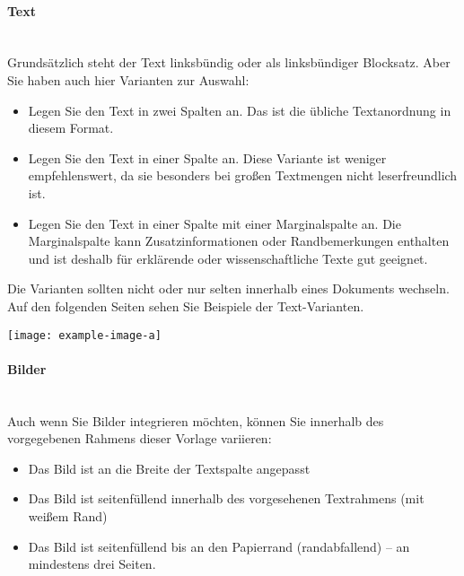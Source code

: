 \documentclass[parskip=on, twoside]{scrartcl}
\begin{document}
\begin{multicols*}{2}
  \paragraph{Text}\strut\\
  Grundsätzlich steht der Text linksbündig oder als linksbündiger Blocksatz.
  Aber Sie haben auch hier Varianten zur Auswahl:
  \begin{itemize}
    \item Legen Sie den Text in zwei Spalten an. Das ist die übliche
      Textanordnung in diesem Format.
    \item Legen Sie den Text in einer Spalte an. Diese Variante ist weniger
      empfehlenswert, da sie besonders bei großen Textmengen nicht
      leserfreundlich ist.
    \item Legen Sie den Text in einer Spalte mit einer Marginalspalte an. Die
      Marginalspalte kann Zusatzinformationen oder Randbemerkungen enthalten
      und ist deshalb für erklärende oder wissenschaftliche Texte gut
      geeignet.
  \end{itemize}
  Die Varianten sollten nicht oder nur selten innerhalb eines Dokuments
  wechseln. Auf den folgenden Seiten sehen Sie Beispiele der Text-Varianten.
\end{multicols*}

\pagestyle{TUM.margincolumn}
\strut{}

\vspace{-\baselineskip}\vspace{-\parskip}
\begingroup
\texttt{[image: example-image-a]}
\endgroup

\paragraph{Bilder}\strut\\
Auch wenn Sie Bilder integrieren möchten, können Sie innerhalb des
vorgegebenen Rahmens dieser Vorlage variieren:
\begin{itemize}
  \item Das Bild ist an die Breite der Textspalte angepasst
  \item Das Bild ist seitenfüllend innerhalb des vorgesehenen Textrahmens (mit
    weißem Rand)
  \item Das Bild ist seitenfüllend bis an den Papierrand (randabfallend) --
    an mindestens drei Seiten.
\end{itemize}
\end{document}
